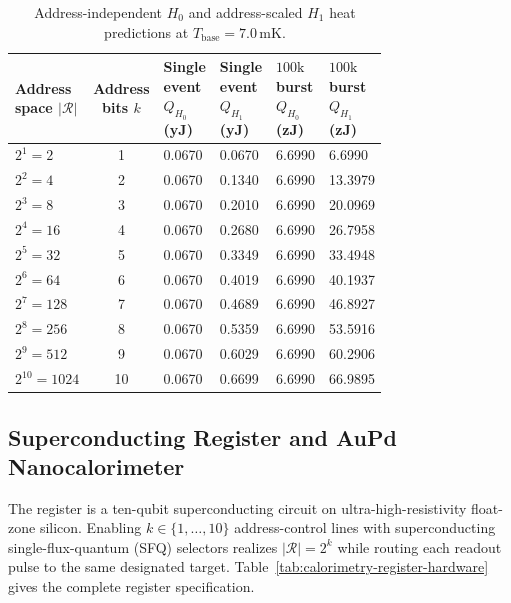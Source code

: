 \documentclass[11pt,letterpaper]{article}
\theoremstyle{plain}
\begin{document}
\begin{table}[htbp]
\centering
\scriptsize
\begin{tabular}{@{}L{0.15\linewidth}c L{0.135\linewidth}L{0.135\linewidth}L{0.16\linewidth}L{0.16\linewidth}@{}}
\toprule
Address space \(|\mathcal R|\) & Address bits \(k\) & Single event \(Q_{H_0}\) (yJ) & Single event \(Q_{H_1}\) (yJ) & \(100\mathrm{k}\) burst \(Q_{H_0}\) (zJ) & \(100\mathrm{k}\) burst \(Q_{H_1}\) (zJ) \\
\midrule
\(2^1=2\)       & 1  & 0.0670 & 0.0670 & 6.6990 & 6.6990 \\
\(2^2=4\)       & 2  & 0.0670 & 0.1340 & 6.6990 & 13.3979 \\
\(2^3=8\)       & 3  & 0.0670 & 0.2010 & 6.6990 & 20.0969 \\
\(2^4=16\)      & 4  & 0.0670 & 0.2680 & 6.6990 & 26.7958 \\
\(2^5=32\)      & 5  & 0.0670 & 0.3349 & 6.6990 & 33.4948 \\
\(2^6=64\)      & 6  & 0.0670 & 0.4019 & 6.6990 & 40.1937 \\
\(2^7=128\)     & 7  & 0.0670 & 0.4689 & 6.6990 & 46.8927 \\
\(2^8=256\)     & 8  & 0.0670 & 0.5359 & 6.6990 & 53.5916 \\
\(2^9=512\)     & 9  & 0.0670 & 0.6029 & 6.6990 & 60.2906 \\
\(2^{10}=1024\) & 10 & 0.0670 & 0.6699 & 6.6990 & 66.9895 \\
\bottomrule
\end{tabular}
\caption{Address-independent \(H_0\) and address-scaled \(H_1\) heat
predictions at \(T_{\text{base}}=7.0\,\mathrm{mK}\).}
\label{tab:calorimetry-energy-predictions}
\end{table}

\subsection{Superconducting Register and AuPd Nanocalorimeter}
\label{sec:calorimetry-hardware}

The register is a ten-qubit superconducting circuit on ultra-high-resistivity
float-zone silicon.  Enabling \(k\in\{1,\ldots,10\}\) address-control lines
with superconducting single-flux-quantum (SFQ) selectors realizes
\(|\mathcal R|=2^k\) while routing each readout pulse to the same designated
target.  Table~\ref{tab:calorimetry-register-hardware} gives the complete
register specification.
\end{document}
